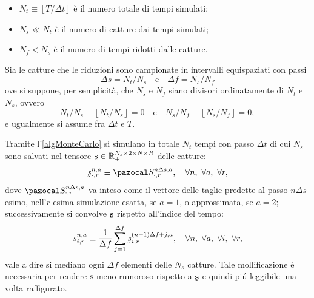       \begin{itemize}[
        label=\(\diamond\),
      ]
        \item \(N_t\equiv\left\lfloor T/\Delta t\right\rfloor\) è il numero totale di tempi simulati;
        \item \(N_s\ll N_t\) è il numero di catture dai tempi simulati;
        \item \(N_f<N_s\) è il numero di tempi ridotti dalle catture.
      \end{itemize}

      Sia le catture che le riduzioni sono campionate in intervalli equispaziati con passi
      \begin{equation*}
        \Delta s=N_t/N_s
        \quad\text{e}\quad
        \Delta f=N_s/N_f
      \end{equation*}
      ove si suppone, per semplicità, che \(N_s\) e \(N_f\) siano divisori ordinatamente di \(N_t\) e \(N_s\), ovvero
      \begin{equation*}
        N_t/N_s-\left\lfloor N_t/N_s\right\rfloor=0
        \quad\text{e}\quad
        N_s/N_f-\left\lfloor N_s/N_f\right\rfloor=0,
      \end{equation*}
      e ugualmente si assume fra \(\Delta t\) e \(T\).
      
      Tramite l'\cref{algMonteCarlo} si simulano in totale \(N_t\) tempi con passo \(\Delta t\) di cui \(N_s\) sono salvati nel tensore \(\undertilde{\mathbf s}\in\RPlus^{N_s\times2\times N\times R}\) delle catture:
      \begin{equation*}
        \undertilde s^{n,a}_{\cdot,r}\equiv\pazocal S^{n\Delta s,a}_{\cdot,r},
        \quad\forall n,\ \forall a,\ \forall r,
      \end{equation*}
      dove \(\pazocal S^{n\Delta s,a}_{\cdot,r}\) va inteso come il vettore delle taglie predette al passo \(n\Delta s\)-esimo, nell'\(r\)-esima simulazione esatta, se \(a=1\), o approssimata, se \(a=2\); successivamente si convolve \(\undertilde{\mathbf s}\) rispetto all'indice del tempo:
      \begin{equation*}
        s^{n,a}_{i,r}\equiv\frac1{\Delta f}\sum_{j=1}^{\Delta f}
        \undertilde s^{(n-1)\Delta f+j,a}_{i,r},
        \quad\forall n,\ \forall a,\ \forall i,\ \forall r,
      \end{equation*}
      vale a dire si mediano ogni \(\Delta f\) elementi delle \(N_s\) catture. Tale mollificazione è necessaria per rendere \(\mathbf s\) meno rumoroso rispetto a \(\undertilde{\mathbf s}\) e quindi piú leggibile una volta raffigurato.

